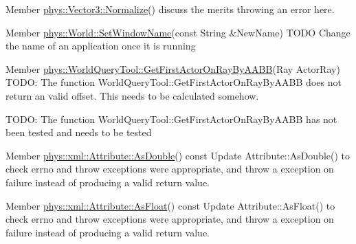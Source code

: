 \label{dd/da0/todo__todo000029}
\hypertarget{dd/da0/todo__todo000029}{}
 
\begin{DoxyDescription}
\item[Member \hyperlink{classphys_1_1Vector3_ae39fe0545df88148bcd668b3bd2a4388}{phys::Vector3::Normalize}() ]discuss the merits throwing an error here. 
\end{DoxyDescription}

\label{dd/da0/todo__todo000034}
\hypertarget{dd/da0/todo__todo000034}{}
 
\begin{DoxyDescription}
\item[Member \hyperlink{classphys_1_1World_acd0dff342c08fe3008226488b7c53d97}{phys::World::SetWindowName}(const String \&NewName) ]TODO Change the name of an application once it is running 
\end{DoxyDescription}

\label{dd/da0/todo__todo000035}
\hypertarget{dd/da0/todo__todo000035}{}
 
\begin{DoxyDescription}
\item[Member \hyperlink{classphys_1_1WorldQueryTool_a67575416c2e9c652bbd873649ee38baf}{phys::WorldQueryTool::GetFirstActorOnRayByAABB}(Ray ActorRay) ]TODO: The function WorldQueryTool::GetFirstActorOnRayByAABB does not return an valid offset. This needs to be calculated somehow. 

TODO: The function WorldQueryTool::GetFirstActorOnRayByAABB has not been tested and needs to be tested 
\end{DoxyDescription}

\label{dd/da0/todo__todo000045}
\hypertarget{dd/da0/todo__todo000045}{}
 
\begin{DoxyDescription}
\item[Member \hyperlink{classphys_1_1xml_1_1Attribute_a467ae167d5407ae3293a22b8873cb43a}{phys::xml::Attribute::AsDouble}() const  ]Update Attribute::AsDouble() to check errno and throw exceptions were appropriate, and throw a exception on failure instead of producing a valid return value. 
\end{DoxyDescription}

\label{dd/da0/todo__todo000046}
\hypertarget{dd/da0/todo__todo000046}{}
 
\begin{DoxyDescription}
\item[Member \hyperlink{classphys_1_1xml_1_1Attribute_aad74f805b9318735011d698ee39113aa}{phys::xml::Attribute::AsFloat}() const  ]Update Attribute::AsFloat() to check errno and throw exceptions were appropriate, and throw a exception on failure instead of producing a valid return value. 
\end{DoxyDescription}

